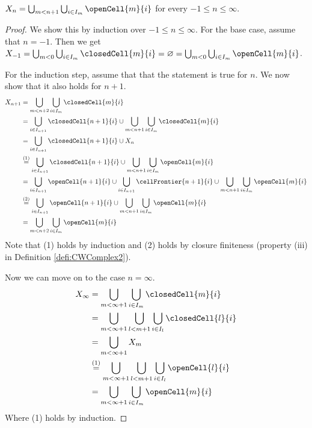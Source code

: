 \begin{lem}\label{lem:skeletonunionopenCell}
    $X_n = \bigcup_{m < n + 1}\bigcup_{i \in I_m} \openCell{m}{i}$ for every $-1 \le n \le \infty$. \href{https://github.com/scholzhannah/CWComplexes/blob/7be4872a05b534011cc969eb5b80a4b7f0bf57e2/CWcomplexes/Definition.lean#L320-L322}{\faExternalLink}
\end{lem}
\begin{proof}
    We show this by induction over $-1 \le n \le \infty$.
    For the base case, assume that $n = -1$.
    Then we get $X_{-1} = \bigcup_{m < 0}\bigcup_{i \in I_m}\closedCell{m}{i} = \varnothing = \bigcup_{m < 0}\bigcup_{i \in I_m} \openCell{m}{i}$.

    For the induction step, assume that that the statement is true for $n$.
    We now show that it also holds for $n + 1$.
    \begin{equation*}
        \begin{split}
            X_{n + 1} &= \bigcup_{m < n + 2}\bigcup_{i \in I_m} \closedCell{m}{i} \\
            &=\bigcup_{i \in I_{n + 1}}\closedCell{n+1}{i} \cup \bigcup_{m < n + 1}\bigcup_{i \in I_m} \closedCell{m}{i} \\
            &= \bigcup_{i \in I_{n + 1}}\closedCell{n+1}{i} \cup X_n \\
            &\stackrel{(1)}{=} \bigcup_{i \in I_{n + 1}}\closedCell{n+1}{i} \cup \bigcup_{m < n + 1}\bigcup_{i \in I_m} \openCell{m}{i} \\
            &= \bigcup_{i \in I_{n + 1}}\openCell{n+1}{i} \cup \bigcup_{i \in I_{n + 1}}\cellFrontier{n+1}{i} \cup \bigcup_{m < n + 1}\bigcup_{i \in I_m} \openCell{m}{i} \\
            &\stackrel{(2)}{=} \bigcup_{i \in I_{n + 1}}\openCell{n+1}{i} \cup \bigcup_{m < n + 1}\bigcup_{i \in I_m} \openCell{m}{i} \\
            &= \bigcup_{m < n + 2}\bigcup_{i \in I_m} \openCell{m}{i}
        \end{split}
    \end{equation*}
    Note that (1) holds by induction and (2) holds by closure finiteness (property (iii) in Definition \ref{defi:CWComplex2}).

    Now we can move on to the case $n = \infty$.
    \begin{equation*}
        \begin{split}
            X_{\infty} &= \bigcup_{m < \infty + 1}\bigcup_{i \in I_m}\closedCell{m}{i} \\
            &= \bigcup_{m < \infty + 1}\bigcup_{l < m + 1}\bigcup_{i \in I_l}\closedCell{l}{i} \\
            &= \bigcup_{m < \infty + 1} X_m \\
            &\stackrel{(1)}{=} \bigcup_{m < \infty + 1}\bigcup_{l < m + 1}\bigcup_{i \in I_l}\openCell{l}{i} \\
            &= \bigcup_{m < \infty + 1}\bigcup_{i \in I_m}\openCell{m}{i}
        \end{split}
    \end{equation*}
    Where (1) holds by induction.
\end{proof}

